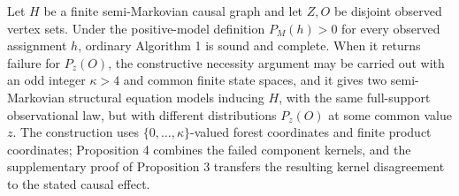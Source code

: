 Let \(H\) be a finite semi-Markovian causal graph and let \(Z,O\) be disjoint observed vertex sets. Under the positive-model definition \(P_M(h)>0\) for every observed assignment \(h\), ordinary Algorithm 1 is sound and complete. When it returns failure for \(P_z(O)\), the constructive necessity argument may be carried out with an odd integer \(\kappa>4\) and common finite state spaces, and it gives two semi-Markovian structural equation models inducing \(H\), with the same full-support observational law, but with different distributions \(P_z(O)\) at some common value \(z\). The construction uses \(\{0,\ldots,\kappa\}\)-valued forest coordinates and finite product coordinates; Proposition 4 combines the failed component kernels, and the supplementary proof of Proposition 3 transfers the resulting kernel disagreement to the stated causal effect.